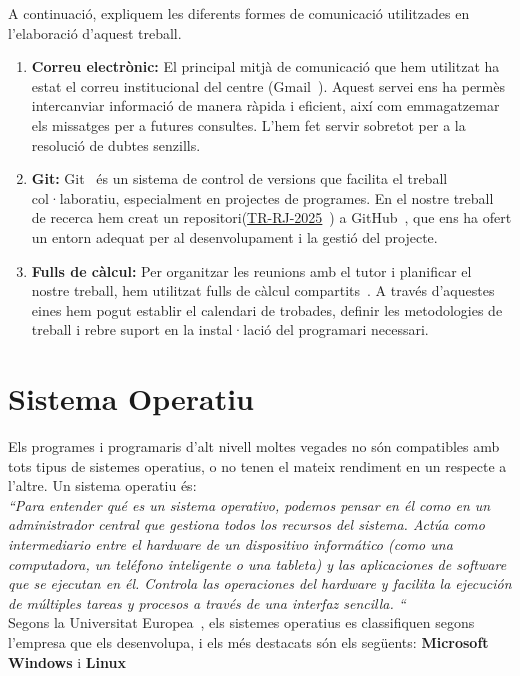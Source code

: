 A continuació, expliquem les diferents formes de comunicació utilitzades en l'elaboració d'aquest treball.
\begin{enumerate}
\item \textbf{Correu electrònic:} El principal mitjà de comunicació que hem utilitzat ha estat el correu institucional del centre (Gmail~\cite{Gmail}). Aquest servei ens ha permès intercanviar informació de manera ràpida i eficient, així com emmagatzemar els missatges per a futures consultes. L’hem fet servir sobretot per a la resolució de dubtes senzills.

\item \textbf{Git:} Git~\cite{git} és un sistema de control de versions que facilita el treball col·laboratiu, especialment en projectes de programes. En el nostre treball de recerca hem creat un repositori(\href{https://github.com/Rui564/TR-RJ-2025}{TR-RJ-2025}~\cite{TR-RJ-2025}) a GitHub~\cite{GitHub}, que ens ha ofert un entorn adequat per al desenvolupament i la gestió del projecte.

\item \textbf{Fulls de càlcul:} Per organitzar les reunions amb el tutor i planificar el nostre treball, hem utilitzat fulls de càlcul compartits~\cite{FullDeCàlcul}. A través d’aquestes eines hem pogut establir el calendari de trobades, definir les metodologies de treball i rebre suport en la instal·lació del programari necessari.
\end{enumerate}

\section{Sistema Operatiu}
Els programes i programaris d'alt nivell moltes vegades no són compatibles amb tots tipus de sistemes operatius, o no tenen el mateix rendiment en un respecte a l'altre. %
Un sistema operatiu és:\\
\textit{``Para entender qué es un sistema operativo, podemos pensar en él como en un administrador central que gestiona todos los recursos del sistema. Actúa como intermediario entre el hardware de un dispositivo informático (como una computadora, un teléfono inteligente o una tableta) y las aplicaciones de software que se ejecutan en él. Controla las operaciones del hardware y facilita la ejecución de múltiples tareas y procesos a través de una interfaz sencilla. ``}\\
 Segons la Universitat Europea~\cite{UniversitatEuropea}, els sistemes operatius es classifiquen segons l’empresa que els desenvolupa, i els més destacats són els següents: \textbf{Microsoft Windows} i \textbf{Linux}

